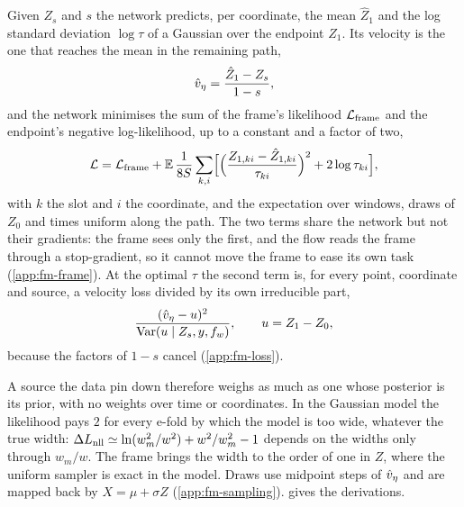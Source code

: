 Given $Z_s$ and $s$ the network predicts, per coordinate, the mean $\hat Z_1$ and the log standard
deviation $\log\tau$ of a Gaussian over the endpoint $Z_1$. Its velocity is the one that reaches
the mean in the remaining path,
\begin{equation}
  \hat v_{\eta} = \frac{\hat Z_1 - Z_s}{1-s},
  \label{eq:fm-velocity}
\end{equation}
and the network minimises the sum of the frame's likelihood $\mathcal L_{\rm frame}$ and the
endpoint's negative log-likelihood, up to a constant and a factor of two,
\begin{equation}
  \mathcal L = \mathcal L_{\rm frame} + \mathbb{E}\,\frac{1}{8S}\sum_{k,i}
  \Bigl[\Bigl(\frac{Z_{1,ki}-\hat Z_{1,ki}}{\tau_{ki}}\Bigr)^2 + 2\log\tau_{ki}\Bigr],
  \label{eq:loss}
\end{equation}
with $k$ the slot and $i$ the coordinate, and the expectation over windows, draws of $Z_0$ and times uniform along the path. The two terms
share the network but not their gradients: the frame sees only the first, and the flow reads the
frame through a stop-gradient, so it cannot move the frame to ease its own task
(\cref{app:fm-frame}). At the optimal $\tau$ the second term is, for every point, coordinate and
source, a velocity loss divided by its own irreducible part,
\begin{equation}
  \frac{(\hat v_{\eta} - u)^2}{\operatorname{Var}(u\mid Z_s,y,f_{w})},\qquad u = Z_1 - Z_0 ,
  \label{eq:fm-relative}
\end{equation}
because the factors of $1-s$ cancel (\cref{app:fm-loss}).

A source the data pin down therefore weighs as much as one whose posterior is its prior, with no
weights over time or coordinates. In the
Gaussian model the likelihood pays $2$ for every e-fold by which the model is too wide, whatever
the true width: $\Delta L_{\rm nll}\simeq\ln(w_m^2/w^2)+w^2/w_m^2-1$ depends on the widths only
through $w_m/w$. The frame brings the width to the order of one in $Z$, where the uniform sampler
is exact in the model. Draws use \FlowMatchingOdeSteps{} midpoint steps of $\hat v_{\eta}$ and are mapped
back by $X=\mu+\sigma Z$ (\cref{app:fm-sampling}).  gives the derivations.
